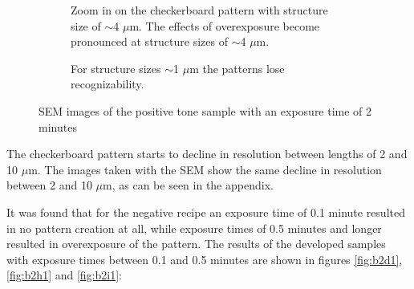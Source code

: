 \begin{figure}[ht]
\begin{subfigure}[t]{0.3\linewidth}
	\caption{Zoom in on the checkerboard pattern with structure size of $\sim$4 $\mu$m. The effects of overexposure become pronounced at structure sizes of $\sim$4 $\mu$m.}
	\label{fig:b2d9_q9}
\end{subfigure}
\hspace*{5mm}
    \begin{subfigure}[t]{0.3\linewidth}
	\centering
	\caption{For structure sizes $\sim$1 $\mu$m the patterns lose recognizability.}
	\label{fig:b2d10_q11}
\end{subfigure}
\caption{SEM images of the positive tone sample with an exposure time of 2 minutes}
\end{figure}

The checkerboard pattern starts to decline in resolution between lengths of 2 and 10 $\mu$m. The images taken with the SEM show the same decline in resolution between 2 and 10 $\mu$m, as can be seen in the appendix.


It was found that for the negative recipe an exposure time of 0.1 minute resulted in no pattern creation at all, while exposure times of 0.5 minutes and longer resulted in overexposure of the pattern. The results of the developed samples with exposure times between 0.1 and 0.5 minutes are shown in figures \ref{fig:b2d1}, \ref{fig:b2h1} and \ref{fig:b2i1}:


